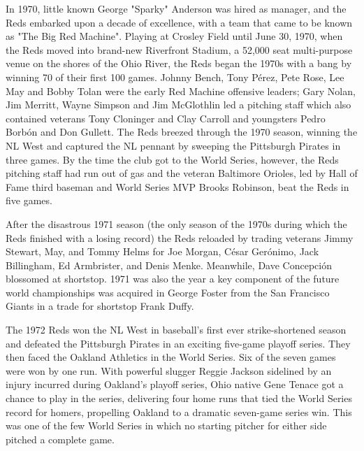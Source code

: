 In 1970, little known George "Sparky" Anderson was hired as manager, and
the Reds embarked upon a decade of excellence, with a team that came to
be known as "The Big Red Machine". Playing at Crosley Field until June
30, 1970, when the Reds moved into brand-new Riverfront Stadium, a
52,000 seat multi-purpose venue on the shores of the Ohio River, the
Reds began the 1970s with a bang by winning 70 of their first 100 games.
Johnny Bench, Tony Pérez, Pete Rose, Lee May and Bobby Tolan were the
early Red Machine offensive leaders; Gary Nolan, Jim Merritt, Wayne
Simpson and Jim McGlothlin led a pitching staff which also contained
veterans Tony Cloninger and Clay Carroll and youngsters Pedro Borbón and
Don Gullett. The Reds breezed through the 1970 season, winning the NL
West and captured the NL pennant by sweeping the Pittsburgh Pirates in
three games. By the time the club got to the World Series, however, the
Reds pitching staff had run out of gas and the veteran Baltimore
Orioles, led by Hall of Fame third baseman and World Series MVP Brooks
Robinson, beat the Reds in five games.

After the disastrous 1971 season (the only season of the 1970s during
which the Reds finished with a losing record) the Reds reloaded by
trading veterans Jimmy Stewart, May, and Tommy Helms for Joe Morgan,
César Gerónimo, Jack Billingham, Ed Armbrister, and Denis Menke.
Meanwhile, Dave Concepción blossomed at shortstop. 1971 was also the
year a key component of the future world championships was acquired in
George Foster from the San Francisco Giants in a trade for shortstop
Frank Duffy.

The 1972 Reds won the NL West in baseball's first ever strike-shortened
season and defeated the Pittsburgh Pirates in an exciting five-game
playoff series. They then faced the Oakland Athletics in the World
Series. Six of the seven games were won by one run. With powerful
slugger Reggie Jackson sidelined by an injury incurred during Oakland's
playoff series, Ohio native Gene Tenace got a chance to play in the
series, delivering four home runs that tied the World Series record for
homers, propelling Oakland to a dramatic seven-game series win. This was
one of the few World Series in which no starting pitcher for either side
pitched a complete game.

